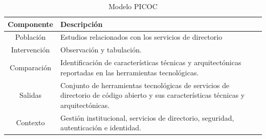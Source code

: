 \begin{table}[H]
	\centering
	\caption{Modelo \acs{PICOC}}
	\label{tab:modelo-picoc}

	\renewcommand{\arraystretch}{1.2}
	\fontsize{9pt}{10pt}\selectfont

	\begin{tabularx}{\textwidth}{|c|X|}
		\hline
		\tableheader
		\textbf{Componente} &
		\textbf{Descripción}
		\\
		\hline
		Población           &
		Estudios relacionados con los servicios de directorio
		\\
		\hline
		Intervención        &
		Observación y tabulación.
		\\
		\hline
		Comparación         &
		Identificación de características técnicas y arquitectónicas reportadas en las herramientas tecnológicas.
		\\
		\hline
		Salidas             &
		Conjunto de herramientas tecnológicas de servicios de directorio de código abierto y sus características técnicas y arquitectónicas.
		\\
		\hline
		Contexto            &
		Gestión institucional, servicios de directorio, seguridad, autenticación e identidad.
		\\
		\hline
	\end{tabularx}
\end{table}
